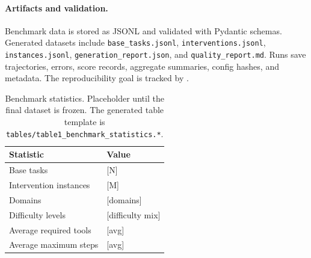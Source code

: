 \paragraph{Artifacts and validation.}
Benchmark data is stored as JSONL and validated with Pydantic schemas. Generated datasets include \texttt{base\_tasks.jsonl}, \texttt{interventions.jsonl}, \texttt{instances.jsonl}, \texttt{generation\_report.json}, and \texttt{quality\_report.md}. Runs save trajectories, errors, score records, aggregate summaries, config hashes, and metadata. The reproducibility goal is tracked by .

\begin{table}[t]
\centering
\caption{Benchmark statistics. Placeholder until the final dataset is frozen. The generated table template is \texttt{tables/table1\_benchmark\_statistics.*}.}
\label{tab:benchmark-stats}
\begin{tabular}{ll}
\toprule
Statistic & Value \\
\midrule
Base tasks & [N] \\
Intervention instances & [M] \\
Domains & [domains] \\
Difficulty levels & [difficulty mix] \\
Average required tools & [avg] \\
Average maximum steps & [avg] \\
\bottomrule
\end{tabular}
\end{table}
